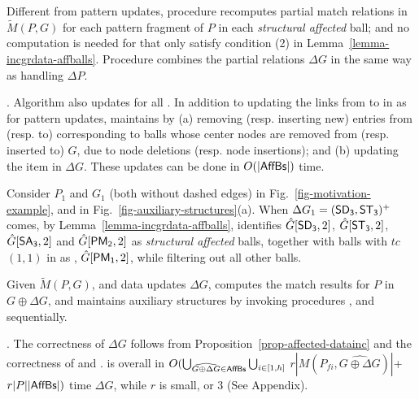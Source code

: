 Different from pattern updates, procedure \incmatch recomputes partial match relations in $\tilde{M}(P,G)$
for each pattern fragment of $P$ in each {\em structural affected} ball;
and no computation is needed for \affballsx that only satisfy condition (2) in Lemma~\ref{lemma-incgrdata-affballs}.
Procedure \comb combines the partial relations \wrt $\Delta G$ in the same way as handling $\Delta P$.


. Algorithm \incd also updates \fb for all \affballsx.
In addition to updating the links from \fs to \bs in \fb as for pattern updates,
\incd maintains \bs by
(a) removing (resp. inserting new) entries from (resp. to) \bs corresponding to balls whose center nodes are removed from (resp. inserted to) $G$, due to node deletions (resp. node insertions);
and (b) updating the  item in \bs \wrt $\Delta G$.
These updates can be done in $O(|{\mathsf{AffBs}}|)$ time.


\begin{example}
\label{exa-Ginc}
Consider $P_1$ and $G_1$ (both without dashed edges) in Fig.~\ref{fig-motivation-example}, and \fb in Fig.~\ref{fig-auxiliary-structures}(a).
When $\Delta G_1=({\mathsf{SD_3}},{\mathsf{ST_3}})^+$ comes,
by Lemma~\ref{lemma-incgrdata-affballs},
\identifyaffball identifies $\hat{G}{[{\mathsf{SD_3}}, 2]}$, $\hat{G}{[{\mathsf{ST_3}},2]}$, $\hat{G}{[{\mathsf{SA_3}}, 2]}$ and $\hat{G}{[{\mathsf{PM_2}}, 2]}$ as {\em structural affected} balls,
together with balls with $tc$ $(1, 1)$ in \fb as \affballsx, \ie $\hat{G}{[{\mathsf{PM_1}}, 2]}$, while filtering out all other balls.
\end{example}


 Given $\tilde{M}(P,G)$, \fb and data updates $\Delta G$,
\incd computes the match results for $P$ in $G \oplus \Delta G$, and maintains
auxiliary structures by invoking procedures \identifyaffball, \incmatch and \comb sequentially.


. The correctness of \incd \wrt $\Delta G$ follows from Proposition~\ref{prop-affected-datainc} and the correctness of \incmatch and \comb.
\incd is overall in
$O(\bigcup_{\widehat{G\oplus\Delta G}\in {\ensuremath {\mathsf{AffBs}}}}\bigcup_{i\in[1,h]}$ $r|M(P_{fi}, \widehat{G\oplus\Delta G})|$+$r|P||{\mathsf{AffBs}}|)$ time \wrt $\Delta G$, while $r$ is small,  or 3  (See Appendix).



